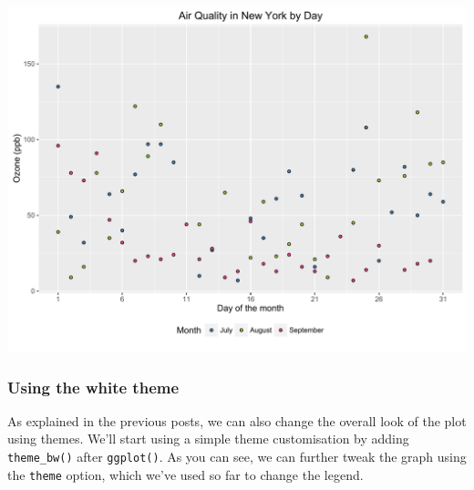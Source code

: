 \documentclass[]{article}
\begin{document}
\begin{center}\includegraphics{0_all_posts_pdf/scatter_11-1} \end{center}

\subsubsection{Using the white theme}\label{using-the-white-theme-4}

As explained in the previous posts, we can also change the overall look
of the plot using themes. We'll start using a simple theme customisation
by adding \texttt{theme\_bw()} after \texttt{ggplot()}. As you can see,
we can further tweak the graph using the \texttt{theme} option, which
we've used so far to change the legend.
\end{document}

